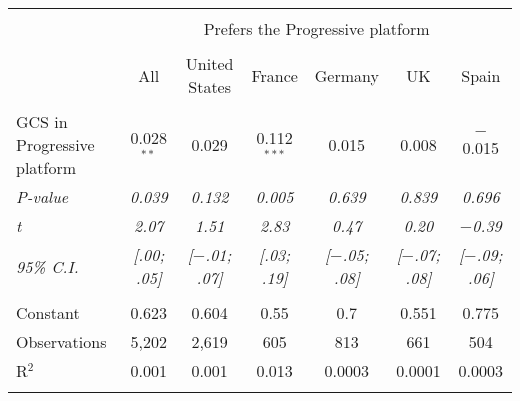 
\begin{tabular}{@{\extracolsep{5pt}}lcccccc} 
\\[-1.8ex]\hline 
\hline \\[-1.8ex] 
 & \multicolumn{6}{c}{Prefers the Progressive platform} \\ 
\cline{2-7} 
\\[-1.8ex] & All & United States & France & Germany & UK & Spain \\ 
\hline \\[-1.8ex] 
 GCS in Progressive platform & 0.028$^{**}$ & 0.029 & 0.112$^{***}$ & 0.015 & 0.008 & $-$0.015 \\ 
 \textit{P-value} & \textit{0.039} & \textit{0.132} & \textit{0.005} & \textit{0.639} & \textit{0.839} & \textit{0.696} \\ 
 \textit{t} & \textit{2.07} & \textit{1.51} & \textit{2.83} & \textit{0.47} & \textit{0.20} & \textit{$-$0.39} \\  %
 \textit{95\% C.I.} & \textit{[.00; .05]} & \textit{[$-$.01; .07]} & \textit{[.03; .19]} & \textit{[$-$.05; .08]} & \textit{[$-$.07; .08]} & \textit{[$-$.09; .06]} \\ %
 \hline \\[-1.8ex] 
Constant & 0.623 & 0.604 & 0.55 & 0.7 & 0.551 & 0.775 \\ 
Observations & 5,202 & 2,619 & 605 & 813 & 661 & 504 \\ 
R$^{2}$ & 0.001 & 0.001 & 0.013 & 0.0003 & 0.0001 & 0.0003 \\ 
\hline 
\hline \\[-1.8ex] 
\end{tabular} 